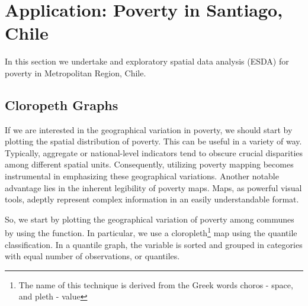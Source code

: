 \documentclass[english,12pt]{book}\usepackage[]{graphicx}\usepackage[]{xcolor}
\begin{document}



\section{Application: Poverty in Santiago, Chile}

In this section we undertake and exploratory spatial data analysis (ESDA) for poverty in Metropolitan Region, Chile.  


\subsection{Cloropeth Graphs}

If we are interested in the geographical variation in poverty, we should start by plotting the spatial distribution of poverty.  This can be useful in a variety of way.  Typically, aggregate or national-level indicators tend to obscure crucial disparities among different spatial units. Consequently, utilizing poverty mapping becomes instrumental in emphasizing these geographical variations. Another notable advantage lies in the inherent legibility of poverty maps. Maps, as powerful visual tools, adeptly represent complex information in an easily understandable format.

So, we start by plotting the geographical variation of poverty among communes by using the  function. In particular, we use a cloropleth\footnote{The name of this technique is derived from the Greek words choros - space, and pleth - value} map using the quantile classification. In a quantile graph, the variable is sorted and grouped in categories with equal number of observations, or quantiles. 
\end{document}
